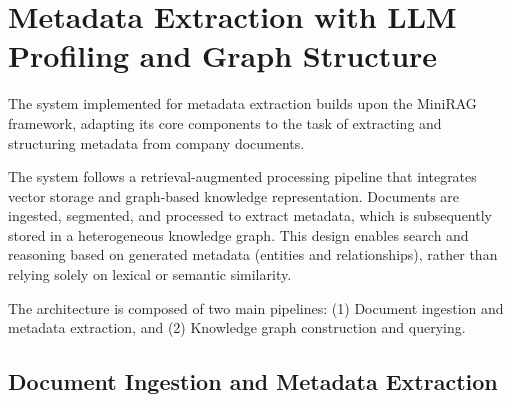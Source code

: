 \section{Metadata Extraction with \gls{LLM} Profiling and Graph Structure}
The system implemented for metadata extraction builds upon the MiniRAG framework, adapting its core components to the task of extracting and structuring metadata from company documents.

The system follows a retrieval-augmented processing pipeline that integrates vector storage and graph-based knowledge representation.  
Documents are ingested, segmented, and processed to extract metadata, which is subsequently stored in a heterogeneous knowledge graph.  
This design enables search and reasoning based on generated metadata (entities and relationships), rather than relying solely on lexical or semantic similarity.

The architecture is composed of two main pipelines:  
(1) Document ingestion and metadata extraction, and  
(2) Knowledge graph construction and querying.

\subsection{Document Ingestion and Metadata Extraction}

